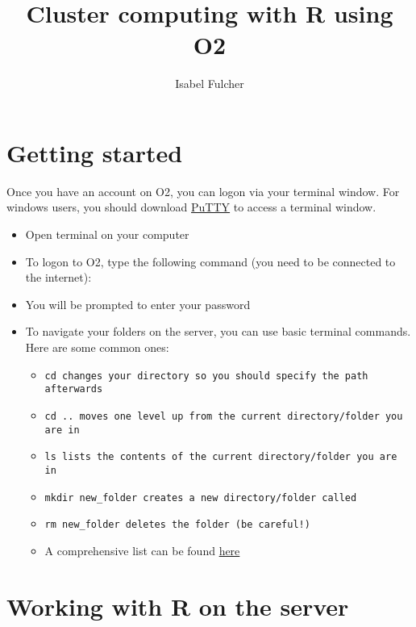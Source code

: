 \documentclass[11pt, oneside]{article}   	%
\title{Cluster computing with R using O2}
\author{Isabel Fulcher}
\begin{document}
	\maketitle
	
\section{Getting started}

Once you have an account on O2, you can logon via your terminal window. For windows users, you should download \href{https://www.putty.org/}{PuTTY} to access a terminal window. 

\begin{itemize}
	\item Open terminal on your computer
	\item To logon to O2, type the following command (you need to be connected to the internet): 
	
	\begin{center}
	\end{center}
	
	\item You will be prompted to enter your password 
	\item To navigate your folders on the server, you can use basic terminal commands. Here are some common ones: 
	\begin{itemize}
		\item \tt{cd} \normalfont changes your directory so you should specify the path afterwards
		\item \tt{cd ..} \normalfont moves one level up from the current directory/folder you are in
 		\item \tt{ls} \normalfont lists the contents of the current directory/folder you are in 
 		\item \tt{mkdir new\_folder} \normalfont creates a new directory/folder called 
 		\item \tt{rm new\_folder}  \normalfont deletes the  \normalfont folder (be careful!)
 		\item A comprehensive list can be found \href{https://github.com/0nn0/terminal-mac-cheatsheet/blob/master/README.md}{here}
	\end{itemize}
\end{itemize}
	
\section{Working with R on the server}
\end{document}
